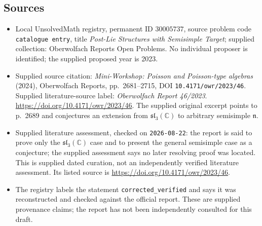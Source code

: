 \documentclass[11pt]{article}
\newcommand{\C}{\mathbb{C}}
\begin{document}
\subsection{Sources}
\begin{itemize}
\item Local UnsolvedMath registry, permanent ID \(30005737\), source problem code \texttt{catalogue entry}, title \emph{Post-Lie Structures with Semisimple Target}; supplied collection: Oberwolfach Reports Open Problems. No individual proposer is identified; the supplied proposed year is 2023.
\item Supplied source citation: \emph{Mini-Workshop: Poisson and Poisson-type algebras} (2024), Oberwolfach Reports, pp.~2681--2715, DOI \texttt{10.4171/owr/2023/46}. Supplied literature-source label: \emph{Oberwolfach Report 46/2023}. \url{https://doi.org/10.4171/owr/2023/46}. The supplied original excerpt points to p.~2689 and conjectures an extension from \(\mathfrak{sl}_3(\C)\) to arbitrary semisimple \(\mathfrak n\).
\item Supplied literature assessment, checked on \texttt{2026-08-22}: the report is said to prove only the \(\mathfrak{sl}_3(\C)\) case and to present the general semisimple case as a conjecture; the supplied assessment says no later resolving proof was located. This is supplied dated curation, not an independently verified literature assessment. Its listed source is \url{https://doi.org/10.4171/owr/2023/46}.
\item The registry labels the statement \texttt{corrected\_verified} and says it was reconstructed and checked against the official report. These are supplied provenance claims; the report has not been independently consulted for this draft.
\end{itemize}
\end{document}
